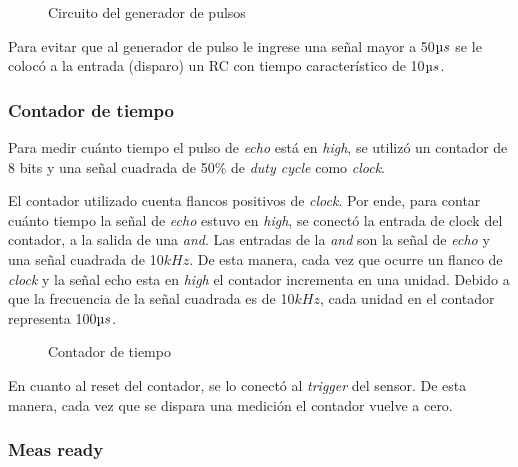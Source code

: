 \documentclass[../../e3_tp2_main.tex]{subfiles}
\begin{document}
\begin{figure}[H]	
	\centering
	\caption{Circuito del generador de pulsos}
	\label{fig:555c}
\end{figure}
Para evitar que al generador de pulso le ingrese una señal mayor a 50$\micro s$ se le coloc\'o a la entrada (disparo) un RC con tiempo característico de 10$\micro s$. 

\subsubsection{Contador de tiempo}
Para medir cu\'anto tiempo el pulso de \textit{echo} est\'a en \textit{high}, se utilizó un contador de 8 bits y una señal cuadrada de 50\% de \textit{duty cycle} como \textit{clock}.
\par El contador utilizado cuenta flancos positivos de \textit{clock}. Por ende, para contar cu\'anto tiempo la señal de \textit{echo} estuvo en \textit{high}, se conectó la entrada de clock del contador, a la salida de una \textit{and}. Las entradas de la \textit{and} son la señal de \textit{echo} y una señal cuadrada de 10$kHz$. De esta manera, cada vez que ocurre un flanco de \textit{clock} y la señal echo esta en \textit{high} el contador incrementa en una unidad. Debido a que la frecuencia de la señal cuadrada es de 10$kHz$, cada unidad en el contador representa 100$\micro s$.
\begin{figure}[H]	
	\centering
	\caption{Contador de tiempo}
\end{figure}
\par En cuanto al reset del contador, se lo conect\'o al \textit{trigger} del sensor. De esta manera, cada vez que se dispara una medición el contador vuelve a cero.
\subsubsection{Meas ready}
\end{document}
